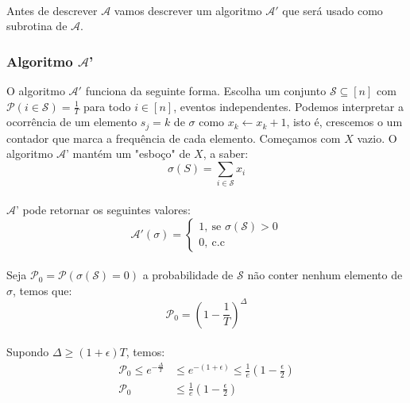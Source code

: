 \paragraph{}Antes de descrever $\mathcal{A}$ vamos descrever um algoritmo $\mathcal{A}'$ que será usado como subrotina de $\mathcal{A}$.

\subsubsection{Algoritmo $\mathcal{A}$'}
O algoritmo $\mathcal{A}'$ funciona da seguinte forma. Escolha um conjunto $\mathcal{S} \subseteq [n]$ com $\mathcal{P}( i \in \mathcal{S}) = \frac{1}{T}$ para todo $i \in [n]$, eventos independentes. Podemos interpretar a ocorrência de um elemento $s_j = k$ de $\sigma$ como $x_k \leftarrow x_k + 1$, isto é, crescemos o um contador que marca a frequência de cada elemento. Começamos com $X$ vazio. O algoritmo $\mathcal{A}$' mantém um "esboço" de $X$, a saber:
$$\sigma(S) = \sum_{i \in \mathcal{S}}x_i$$
\paragraph{}$\mathcal{A}$' pode retornar os seguintes valores:
\[
   \mathcal{A}'(\sigma) = \begin{cases} 
                    1,\ \text{se }\sigma(\mathcal{S}) > 0\\ 
                    0,\ \text{c.c }\end{cases}
\]

\paragraph{}Seja $\mathcal{P}_0 = \mathcal{P}(\sigma(\mathcal{S})= 0)$ a probabilidade de $\mathcal{S}$ não conter nenhum elemento de $\sigma$, temos que:
\begin{equation*}
\mathcal{P}_0 = \left(1-\frac{1}{T} \right)^\Delta    
\end{equation*}
\paragraph{} Supondo $\Delta \geq (1+\epsilon)T$, temos:
\begin{align*}
    \mathcal{P}_0 \leq e ^{-\frac{\Delta}{T}} &\leq e ^{-(1+\epsilon)} \leq \frac{1}{e} \left(1-\frac{\epsilon}{2}\right)\\
    \mathcal{P}_0 &\leq \frac{1}{e} \left(1-\frac{\epsilon}{2}\right)
\end{align*}
